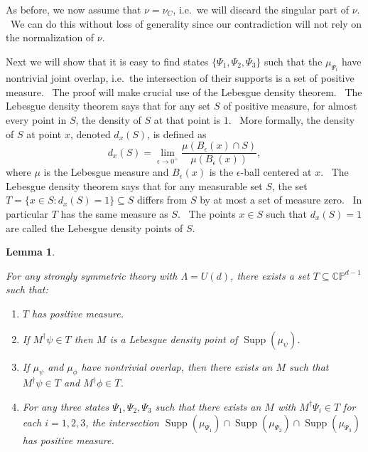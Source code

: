 \documentclass[letterpaper,12pt]{article}
\newtheorem{lem}{Lemma}
\DeclareMathOperator{\supp}{Supp}
\begin{document}
As before, we now assume that $\nu =\nu_{C}$, i.e.\ we will discard the singular part of $\nu$. \ We can do this without loss of generality since our contradiction will not rely on the normalization of $\nu$.

Next we will show that it is easy to find states $\{\Psi_1,\Psi_2,\Psi_3\}$ such that the $\mu_{\Psi_i}$ have nontrivial joint overlap, i.e.\ the intersection of their supports is a set of positive measure. \ The proof will make crucial use of the Lebesgue density theorem. \ The Lebesgue density theorem says that for any set $S$ of positive measure, for almost every point in $S$, the density of $S$ at that point is $1$. \ More formally, the density of $S$ at point $x$, denoted $d_x(S)$, is defined as
\[
d_x(S) = \lim_{\epsilon \rightarrow 0^+} \frac{\mu(B_{\epsilon}(x) \cap S)}{\mu(B_{\epsilon}(x))},
\]
where $\mu$ is the Lebesgue measure and $B_{\epsilon}(x)$ is the $\epsilon$-ball centered at $x$. \ The Lebesgue density theorem says that for any measurable set $S$, the set $T=\{x\in S : d_x(S)=1\}\subseteq S$ differs from $S$ by at most a set of measure zero. \ In particular $T$ has the same measure as $S$. \ The points $x\in S$ such that $d_x(S)=1$ are called the Lebesgue density points of $S$.

\begin{lem}
\label{lem:joint-overlap-properties}

For any strongly symmetric theory with $\Lambda=U(d)$, there exists a set $T\subseteq \mathbb{CP}^{d-1}$ such that:

\begin{enumerate}
\item $T$ has positive measure. \label{Tposmeas}
\item If $M^\dagger \psi \in T$ then $M$ is a Lebesgue density point of $\supp(\mu_\psi)$. \label{Tldp}
\item If $\mu_\psi$ and $\mu_\phi$ have nontrivial overlap, then there exists an $M$ such that $M^\dagger \psi \in T$ and $M^\dagger \phi \in T$. \label{Tintersection}
\item For any three states $\Psi_1,\Psi_2,\Psi_3$ such that there exists an $M$ with $M^\dagger \Psi_i \in T$ for each $i=1,2,3$, the intersection $\supp(\mu_{\Psi_1}) \cap \supp(\mu_{\Psi_2}) \cap \supp(\mu_{\Psi_3})$ has positive measure. \label{Tjointint}
\end{enumerate}

\end{lem}
\end{document}
